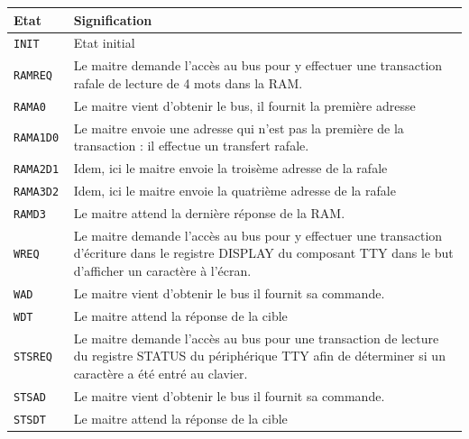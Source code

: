 \documentclass{article}
\begin{document}
\begin{table}[H]
\centering
\begingroup
\setlength{\tabcolsep}{5pt}
\renewcommand{\arraystretch}{1.1}
\begin{tabular}{ | l | p{15cm} | }
\hline
Etat    & Signification \\
\hline

\tt{INIT}    &
Etat initial \\
\hline

\tt{RAMREQ}  &
Le maitre demande l'accès au bus pour y effectuer une transaction rafale
de lecture de 4 mots dans la RAM. \\
\hline

\tt{RAMA0}   &
Le maitre vient d'obtenir le bus, il fournit la première adresse \\
\hline

\tt{RAMA1D0} &
Le maitre envoie une adresse qui n'est pas la première de la transaction :
il effectue un transfert rafale. \\
\hline

\tt{RAMA2D1} &
Idem, ici le maitre envoie la troisème adresse de la rafale \\
\hline

\tt{RAMA3D2} &
Idem, ici le maitre envoie la quatrième adresse de la rafale \\
\hline

\tt{RAMD3}   &
Le maitre attend la dernière réponse de la RAM. \\
\hline

\tt{WREQ}    &
Le maitre demande l'accès au bus pour y effectuer une transaction d'écriture
dans le registre DISPLAY du composant TTY dans le but d'afficher un caractère
à l'écran. \\
\hline

\tt{WAD} &
Le maitre vient d'obtenir le bus il fournit sa commande. \\
\hline

\tt{WDT} &
Le maitre attend la réponse de la cible \\
\hline

\tt{STSREQ}  &
Le maitre demande l'accès au bus pour une transaction de lecture du registre
STATUS du périphérique TTY afin de déterminer si un caractère a été entré au clavier. \\
\hline

\tt{STSAD}   &
Le maitre vient d'obtenir le bus il fournit sa commande. \\
\hline

\tt{STSDT}   &
Le maitre attend la réponse de la cible \\
\hline


\end{tabular}
\end{table}
\end{document}
